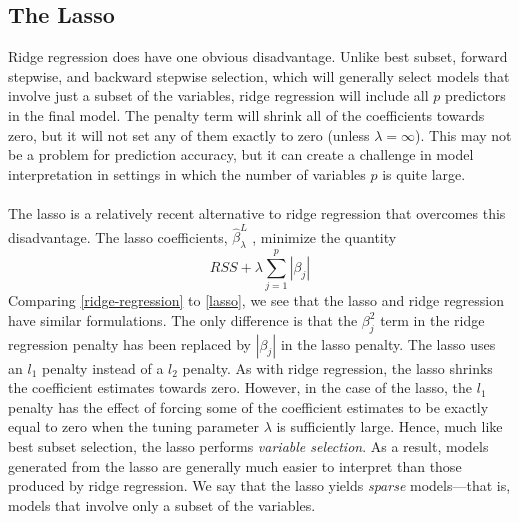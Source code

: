 \subsection{The Lasso}
Ridge regression does have one obvious disadvantage. Unlike best subset, forward stepwise, and backward stepwise selection, which will generally select models that involve just a subset of the variables, ridge regression will include all $p$ predictors in the final model. The penalty term will shrink all of the coefficients towards zero, but it will not set any of them exactly to zero (unless $\lambda = \infty$). This may not be a problem for prediction accuracy, but it can create a challenge in model interpretation in settings in which the number of variables $p$ is quite large.\\\\
The lasso is a relatively recent alternative to ridge regression that overcomes this disadvantage. The lasso coefficients, $\hat{\beta}^L_\lambda$ , minimize the quantity
\begin{equation}
    RSS + \lambda \sum_{j=1}^p |\beta_j|
    \label{lasso}
\end{equation}
Comparing \ref{ridge-regression} to \ref{lasso}, we see that the lasso and ridge regression have similar formulations. The only difference is that the $\beta_j^2$ term in the ridge regression penalty has been replaced by $|\beta_j|$ in the lasso penalty. The lasso uses an $l_1$ penalty instead of a $l_2$ penalty. As with ridge regression, the lasso shrinks the coefficient estimates towards zero. However, in the case of the lasso, the $l_1$ penalty has the effect of forcing some of the coefficient estimates to be exactly equal to zero when the tuning parameter $\lambda$ is sufficiently large. Hence, much like best subset selection, the lasso performs \textit{variable selection}. As a result, models generated from the lasso are generally much easier to interpret than those produced by ridge regression. We say that the lasso yields \textit{sparse} models—that is, models that involve only a subset of the variables. 


